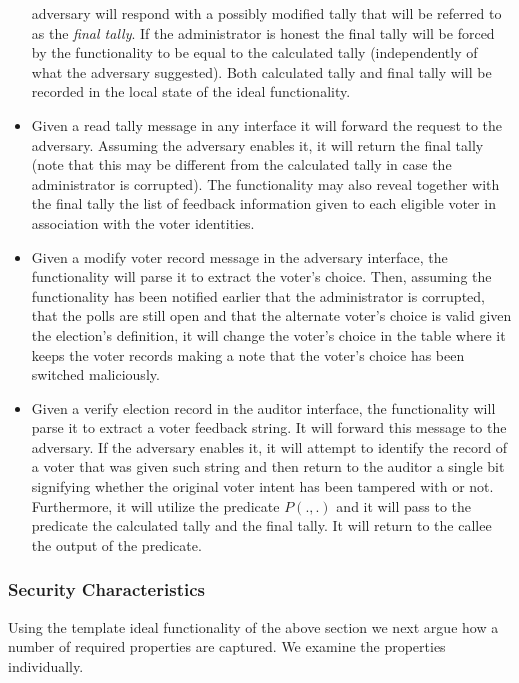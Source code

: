 \begin{itemize}
  adversary will respond with a possibly modified tally that will be
  referred to as the {\em final tally}. If the administrator is honest
  the final tally will be forced by the functionality to be equal to
  the calculated tally (independently of what the adversary
  suggested). Both calculated tally and final tally will be recorded
  in the local state of the ideal functionality.
\item Given a read tally message in any interface it will forward the
  request to the adversary. Assuming the adversary enables it, it will
  return the final tally (note that this may be different from the
  calculated tally in case the administrator is corrupted). The
  functionality may also reveal together with the final tally the list
  of feedback information given to each eligible voter in association
  with the voter identities.
\item Given a modify voter record message in the adversary interface,
  the functionality will parse it to extract the voter's choice. Then,
  assuming the functionality has been notified earlier that the
  administrator is corrupted, that the polls are still open and that
  the alternate voter's choice is valid given the election's
  definition, it will change the voter's choice in the table where it
  keeps the voter records making a note that the voter's choice has
  been switched maliciously.
\item Given a verify election record in the auditor interface, the
  functionality will parse it to extract a voter feedback string. It
  will forward this message to the adversary. If the adversary enables
  it, it will attempt to identify the record of a voter that was given
  such string and then return to the auditor a single bit signifying
  whether the original voter intent has been tampered with or
  not. Furthermore, it will utilize the predicate $P(.,.)$ and it will
  pass to the predicate the calculated tally and the final tally. It
  will return to the callee the output of the predicate.
\end{itemize}

\subsubsection{Security Characteristics}

Using the template ideal functionality of the above section we next
argue how a number of required properties are captured. We examine the
properties individually.

